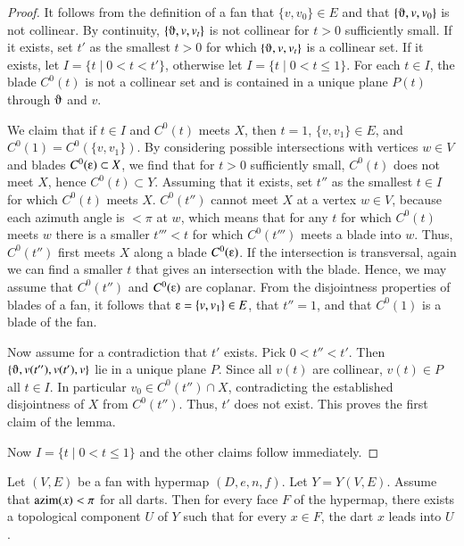 \begin{proof}
It follows from the definition of a fan that $\{v,v_0\}\in E$ and
that $\{\orgn,v,v_0\}$ is not collinear.  By continuity, $\{\orgn,v,v_t\}$
is not collinear for $t>0$ sufficiently small.  If it exists, set $t'$ as
the smallest $t>0$ for which $\{\orgn,v,v_t\}$ is a collinear set.  If it exists, let $I=\{t\mid 0< t < t'\}$, otherwise let $I=\{t\mid 0 < t \le 1\}$.  For each $t\in I$, the blade $C^0(t)$ is not a collinear set and is contained in a unique plane $P(t)$ through $\orgn$ and $v$.

We claim that if $t\in I$ and $C^0(t)$ meets $X$, then $t=1$, $\{v,v_1\}\in E$, and $C^0(1)= C^0(\{v,v_1\})$.  By considering possible intersections with vertices $w\in V$ and blades
$C^0(\e)\subset X$, we find that for $t>0$ sufficiently small,
$C^0(t)$ does not meet $X$, hence $C^0(t)\subset Y$.  Assuming 
that it exists, set $t''$
as the smallest $t\in I$ for which $C^0(t)$ meets $X$.   
$C^0(t'')$ cannot meet $X$ at a vertex $w\in V$, because each azimuth angle
is $<\pi$ at $w$, which means that for any $t$ for which  $C^0(t)$ meets $w$ 
there is a smaller $t'''<t$ for which $C^0(t''')$ meets a blade into $w$.
Thus, $C^0(t'')$ first meets $X$ along a blade $C^0(\e)$. If
the intersection is transversal, again we can find a smaller $t$ that
gives an intersection with the blade.  Hence, we may assume that
$C^0(t'')$ and $C^0(\e)$ are coplanar.  From the disjointness
properties of blades of a fan, it follows that $\e = \{v,v_1\}\in E$,
that $t''=1$, and that $C^0(1)$ is a blade of the fan.

Now assume for a contradiction that $t'$ exists.  Pick $0<t''<t'$.  Then
$\{\orgn,v(t''),v(t'),v\}$ lie in a unique plane $P$.  Since all $v(t)$
are collinear,  $v(t)\in P$ all $t\in I$.  In particular $v_0\in C^0(t'')\cap X$,
contradicting the established disjointness of $X$ from $C^0(t'')$.  Thus, $t'$ does not exist.  This proves the first
claim of the lemma.  

Now $I= \{t\mid 0 < t \le 1\}$ and the other claims follow immediately.
\end{proof}

\begin{lemma} 
Let $(V,E)$ be a fan with hypermap $(D,e,n,f)$. Let $Y=Y(V,E)$. Assume that ${\operatorname{azim}}(x)<\pi$ for all darts. Then for every face $F$ of the hypermap, there exists a topological component $U$ of $Y$ such that for every $x\in F$, the dart $x$ leads into $U$. 
\end{lemma}

